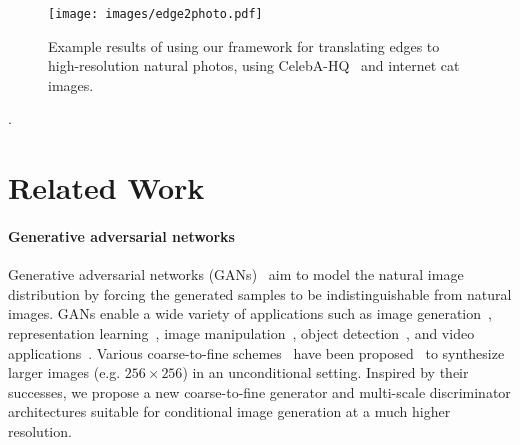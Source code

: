 \documentclass[10pt,twocolumn,letterpaper]{article}
\newcommand{\lblfig}[1]{\label{fig:#1}}
\newcommand{\lblsec}[1]{\label{sec:#1}}
\begin{document}
\begin{figure}[t]
    \centering
    \vspace{-.25in}
    \texttt{[image: images/edge2photo.pdf]}
    \vspace{-.25in}
    \caption{\small Example results of using our framework for translating edges to high-resolution natural photos, using CelebA-HQ~\cite{karras2017progressive} and internet cat images.}
    \lblfig{edge2photo}
    \vspace{-.25in}
\end{figure}.
 \section{Related Work} \lblsec{related}

\paragraph{Generative adversarial networks} 
Generative adversarial networks (GANs)~\cite{goodfellow2014generative} aim to model the natural image distribution by forcing the generated samples to be indistinguishable from natural images. GANs enable a wide variety of applications such as image generation~\cite{radford2015unsupervised,zhao2016energy,arjovsky2017wasserstein}, representation learning~\cite{salimans2016improved}, image manipulation~\cite{zhu2016generative}, object detection~\cite{li2017perceptual}, and video applications~\cite{mathieu2015deep,vondrick2016generating,tulyakov2017mocogan}. Various coarse-to-fine schemes~\cite{burt1983laplacian} have been proposed~\cite{denton2015deep,huang2017sgan,zhang2016stackgan,karras2017progressive} to synthesize larger images (e.g. $256\times 256$) in an unconditional setting. Inspired by their successes, we propose a new coarse-to-fine generator and multi-scale discriminator architectures suitable for conditional image generation at a much higher resolution.
\end{document}
